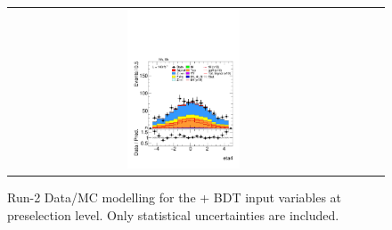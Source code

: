 \begin{figure}[htbp]
\begin{tabular}{@{}c c c@{}}
    \includegraphics[width=0.33\textwidth]{images/plots_modelling_run2_run3_variables/run_2_tth/plot_eta4_hh_tth_15_16_17_18.pdf}
  \end{tabular}

  \caption{Run-2 Data/MC modelling for the \thqb + \ttH BDT input variables at preselection level. Only statistical uncertainties are included.}
  \label{tth_vars_modelling_run2_1}
\end{figure}

